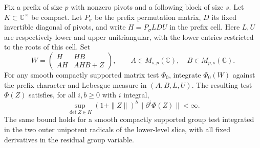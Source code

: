 \begin{auxlemma}\label{lem:compact-prefix-amplitude}
Fix a prefix of size \(p\) with nonzero pivots and a following block of size \(s\). Let \(K\subset\mathbb C^\times\) be compact. Let \(P_\sigma\) be the prefix permutation matrix, \(D\) its fixed invertible diagonal of pivots, and write \(H=P_\sigma LDU\) in the prefix cell. Here \(L,U\) are respectively lower and upper unitriangular, with the lower entries restricted to the roots of this cell. Set
\[
 W=\begin{pmatrix}H&HB\\ AH&AHB+Z\end{pmatrix},\qquad
 A\in M_{s,p}(\mathbb C),\quad B\in M_{p,s}(\mathbb C).
\]
For any smooth compactly supported matrix test \(\Phi_0\), integrate \(\Phi_0(W)\) against the prefix character and Lebesgue measure in \((A,B,L,U)\). The resulting test \(\Phi(Z)\) satisfies, for all \(i,b\ge0\) with \(i\) integral,
\[
 \sup_{\det Z\in K}(1+\|Z\|)^b\|\partial^i\Phi(Z)\|<\infty .
\]
The same bound holds for a smooth compactly supported group test integrated in the two outer unipotent radicals of the lower-level slice, with all fixed derivatives in the residual group variable.
\end{auxlemma}

